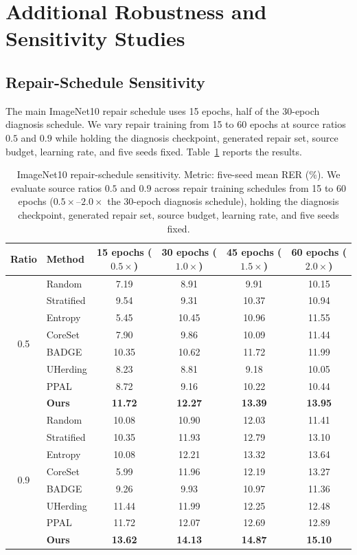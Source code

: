 \section{Additional Robustness and Sensitivity Studies}
\label{app:additional-robustness}

\subsection{Repair-Schedule Sensitivity}

The main ImageNet10 repair schedule uses 15 epochs, half of the 30-epoch diagnosis schedule. We vary repair training from 15 to 60 epochs at source ratios $0.5$ and $0.9$ while holding the diagnosis checkpoint, generated repair set, source budget, learning rate, and five seeds fixed. Table~\ref{tab:repair-schedule-sensitivity} reports the results.

\begin{table}[t]
\centering
\caption{ImageNet10 repair-schedule sensitivity. Metric: five-seed mean RER (\%). We evaluate source ratios $0.5$ and $0.9$ across repair training schedules from 15 to 60 epochs ($0.5\times$--$2.0\times$ the 30-epoch diagnosis schedule), holding the diagnosis checkpoint, generated repair set, source budget, learning rate, and five seeds fixed.}
\label{tab:repair-schedule-sensitivity}
\small
\setlength{\tabcolsep}{6pt}
\begin{tabular}{c l c c c c}
\toprule
\rowcolor{sectiongray} \textbf{Ratio} & \textbf{Method} & \textbf{15 epochs ($0.5\times$)} & \textbf{30 epochs ($1.0\times$)} & \textbf{45 epochs ($1.5\times$)} & \textbf{60 epochs ($2.0\times$)} \\
\midrule
\multirow{8}{*}{0.5} 
& Random & 7.19 & 8.91 & 9.91 & 10.15 \\
& Stratified & 9.54 & 9.31 & 10.37 & 10.94 \\
& Entropy & 5.45 & 10.45 & 10.96 & 11.55 \\
& CoreSet & 7.90 & 9.86 & 10.09 & 11.44 \\
& BADGE & 10.35 & 10.62 & 11.72 & 11.99 \\
& UHerding & 8.23 & 8.81 & 9.18 & 10.05 \\
& PPAL & 8.72 & 9.16 & 10.22 & 10.44 \\
& \textbf{Ours} & \textbf{11.72} & \textbf{12.27} & \textbf{13.39} & \textbf{13.95} \\
\midrule
\multirow{8}{*}{0.9} 
& Random & 10.08 & 10.90 & 12.03 & 11.41 \\
& Stratified & 10.35 & 11.93 & 12.79 & 13.10 \\
& Entropy & 10.08 & 12.21 & 13.32 & 13.64 \\
& CoreSet & 5.99 & 11.96 & 12.19 & 13.27 \\
& BADGE & 9.26 & 9.93 & 10.97 & 11.36 \\
& UHerding & 11.44 & 11.99 & 12.25 & 12.48 \\
& PPAL & 11.72 & 12.07 & 12.69 & 12.89 \\
& \textbf{Ours} & \textbf{13.62} & \textbf{14.13} & \textbf{14.87} & \textbf{15.10} \\
\bottomrule
\end{tabular}
\end{table}

